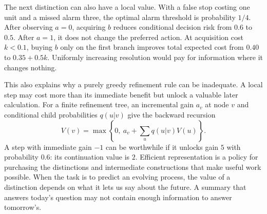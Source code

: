 The next distinction can also have a local value. With a false stop costing one unit and a missed alarm three, the optimal alarm threshold is probability $1/4$. After observing $a=0$, acquiring $b$ reduces conditional decision risk from $0.6$ to $0.5$. After $a=1$, it does not change the preferred action. At acquisition cost $k<0.1$, buying $b$ only on the first branch improves total expected cost from $0.40$ to $0.35+0.5k$. Uniformly increasing resolution would pay for information where it changes nothing.

This also explains why a purely greedy refinement rule can be inadequate. A local step may cost more than its immediate benefit but unlock a valuable later calculation. For a finite refinement tree, an incremental gain $a_v$ at node $v$ and conditional child probabilities $q(u|v)$ give the backward recursion
\begin{equation}
 V(v)=\max\left\{0,\ a_v+\sum_u q(u|v)V(u)\right\}.
 \label{eq:refinement-value}
\end{equation}
A step with immediate gain $-1$ can be worthwhile if it unlocks gain $5$ with probability $0.6$: its continuation value is $2$. Efficient representation is a policy for purchasing the distinctions and intermediate constructions that make useful work possible. When the task is to predict an evolving process, the value of a distinction depends on what it lets us say about the future. A summary that answers today's question may not contain enough information to answer tomorrow's.

